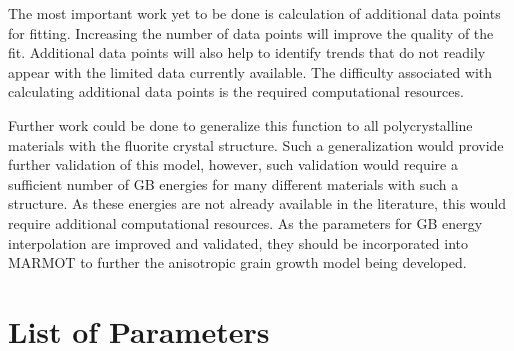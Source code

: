 \documentclass[twoside,senior]{BYUPhys}
\begin{document}
The most important work yet to be done is calculation of additional data points for fitting.  Increasing the number of data points will improve the quality of the fit.  Additional data points will also help to identify trends that do not readily appear with the limited data currently available.  The difficulty associated with calculating additional data points is the required computational resources.  %

Further work could be done to generalize this function to all polycrystalline materials with the fluorite crystal structure.  Such a generalization would provide further validation of this model, however, such validation would require a sufficient number of GB energies for many different materials with such a structure.  As these energies are not already available in the literature, this would require additional computational resources.  As the parameters for GB energy interpolation are improved and validated, they should be incorporated into MARMOT to further the anisotropic grain growth model being developed.


\appendix
\renewcommand\chaptername{Appendix}

 \cleardoublepage
 

\chapter{List of Parameters\label{app:params}}
\end{document}
